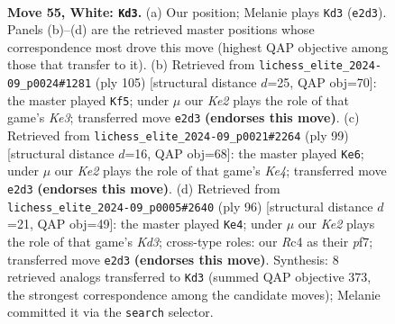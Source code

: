 \documentclass[11pt]{article}
\begin{document}
\clearpage

\begin{figure}[p]\centering
\begin{subfigure}{0.46\textwidth}\centering
\resizebox{\linewidth}{!}{%
\newchessgame
\chessboard[
  setfen={8/5p2/4pk2/R7/P1R1P3/5P2/4K2r/8 w - - 1 55},
  showmover=false,
  pgfstyle=straightmove, color=movearrow, markmove={e2-d3}
]}
\caption{}
\end{subfigure}\hfill
\begin{subfigure}{0.46\textwidth}\centering
\resizebox{\linewidth}{!}{%
\newchessgame
\chessboard[
  setfen={5r2/8/1R2k3/p3p3/r5p1/6P1/3R1PK1/8 b - - 17 53},
  showmover=false,
  pgfstyle=straightmove, color=movearrow, markmove={e6-f5}
]}
\caption{}
\end{subfigure}
\\[4pt]
\begin{subfigure}{0.46\textwidth}\centering
\resizebox{\linewidth}{!}{%
\newchessgame
\chessboard[
  setfen={8/8/5p2/1R2k1p1/4p1r1/4P3/4KP2/8 b - - 1 50},
  showmover=false,
  pgfstyle=straightmove, color=movearrow, markmove={e5-e6}
]}
\caption{}
\end{subfigure}\hfill
\begin{subfigure}{0.46\textwidth}\centering
\resizebox{\linewidth}{!}{%
\newchessgame
\chessboard[
  setfen={8/5pk1/6p1/1P5p/1R5P/3KP3/8/3r4 w - - 4 49},
  showmover=false,
  pgfstyle=straightmove, color=movearrow, markmove={d3-e4}
]}
\caption{}
\end{subfigure}
\caption{\textbf{Move 55, White: \texttt{Kd3}.} (a) Our position; Melanie plays \texttt{Kd3} (\texttt{e2d3}). Panels (b)--(d) are the retrieved master positions whose correspondence most drove this move (highest QAP objective among those that transfer to it). (b) Retrieved from \texttt{lichess\_elite\_2024-09\_p0024\#1281} (ply 105) [structural distance $d$=25, QAP obj=70]: the master played \texttt{Kf5}; under $\mu$ our \emph{Ke2} plays the role of that game's \emph{Ke3}; transferred move \texttt{e2d3} \textbf{(endorses this move)}. (c) Retrieved from \texttt{lichess\_elite\_2024-09\_p0021\#2264} (ply 99) [structural distance $d$=16, QAP obj=68]: the master played \texttt{Ke6}; under $\mu$ our \emph{Ke2} plays the role of that game's \emph{Ke4}; transferred move \texttt{e2d3} \textbf{(endorses this move)}. (d) Retrieved from \texttt{lichess\_elite\_2024-09\_p0005\#2640} (ply 96) [structural distance $d$=21, QAP obj=49]: the master played \texttt{Ke4}; under $\mu$ our \emph{Ke2} plays the role of that game's \emph{Kd3}; cross-type roles: our \emph{R}c4 as their \emph{p}f7; transferred move \texttt{e2d3} \textbf{(endorses this move)}. Synthesis: 8 retrieved analogs transferred to \texttt{Kd3} (summed QAP objective 373, the strongest correspondence among the candidate moves); Melanie committed it via the \texttt{search} selector.}
\label{fig:thought-m108}
\end{figure}
\end{document}
